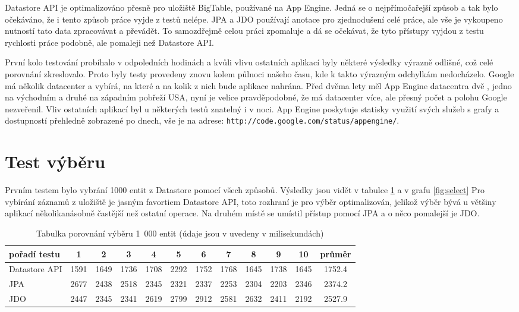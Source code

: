 Datastore API je optimalizováno přesně pro uložiště BigTable, používané na App Engine. Jedná se o nejpřímočařejší způsob a tak bylo očekáváno, že i tento způsob práce vyjde z testů nelépe. JPA a JDO používají anotace pro zjednodušení celé práce, ale vše je vykoupeno nutností tato data zpracovávat a převádět. To samozdřejmě celou práci zpomaluje a dá se očekávat, že tyto přístupy vyjdou z testu rychlosti práce podobně, ale pomaleji než Datastore API.

První kolo testování probíhalo v odpoledních hodinách a kvůli vlivu ostatních aplikací byly některé výsledky výrazně odlišné, což celé porovnání zkreslovalo. Proto byly testy provedeny znovu kolem půlnoci našeho času, kde k takto výrazným odchylkám nedocházelo. Google má několik datacenter a vybírá, na které a na kolik z nich bude aplikace nahrána. Před dvěma lety měl App Engine datacentra dvě , jedno na východním a druhé na západním pobřeží USA, nyní je velice pravděpodobné, že má datacenter více, ale přesný počet a polohu Google nezveřenil. Vliv ostatních aplikací byl u některých testů znatelný i v noci. App Engine poskytuje statisky využití svých služeb s grafy a dostupností přehledně zobrazené po dnech, vše je na  adrese: \verb|http://code.google.com/status/appengine/|.

\section{Test výběru}
Prvním testem bylo vybrání 1000 entit z Datastore pomocí všech způsobů. Výsledky jsou vidět v tabulce \ref{tab:select} a v grafu \ref{fig:select} Pro vybírání záznamů z uložiště je jasným favortiem Datastore API, toto rozhraní je pro výběr optimalizován, jelikož výběr bývá u většiny aplikací několikanásobně častější než ostatní operace. Na druhém místě se umístil přístup pomocí JPA a o něco pomalejší je JDO.

\begin{table}[h]
\centering
\caption{Tabulka porovnání výběru 1~000 entit (údaje jsou v uvedeny v milisekundách)}\label{tab:select}
\begin{tabular}{|l|c|c|c|c|c|c|c|c|c|c|c|}
   \hline
pořadí testu	& 1		& 2		& 3		& 4		& 5		& 6		& 7		& 8		& 9		& 10		& průměr \\
   \hline
Datastore API	& 1591	& 1649	& 1736	& 1708	& 2292	& 1752	& 1768	& 1645	& 1738	& 1645	& 1752.4 \\
JPA	& 2677	& 2438	& 2518	& 2345	& 2321	& 2337	& 2253	& 2304	& 2203	& 2346	& 2374.2 \\
JDO	& 2447	& 2345	& 2341	& 2619	& 2799	& 2912	& 2581	& 2632	& 2411	& 2192	& 2527.9 \\
   \hline
\end{tabular}
\end{table}

